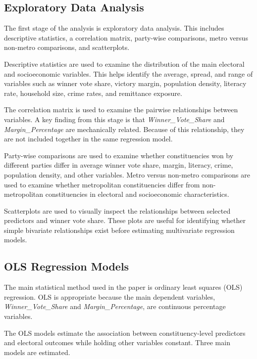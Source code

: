 \documentclass[12pt,a4paper]{article}
\begin{document}
\subsection{Exploratory Data Analysis}

The first stage of the analysis is exploratory data analysis. This includes descriptive statistics, a correlation matrix, party-wise comparisons, metro versus non-metro comparisons, and scatterplots.

Descriptive statistics are used to examine the distribution of the main electoral and socioeconomic variables. This helps identify the average, spread, and range of variables such as winner vote share, victory margin, population density, literacy rate, household size, crime rates, and remittance exposure.

The correlation matrix is used to examine the pairwise relationships between variables. A key finding from this stage is that \textit{Winner\_Vote\_Share} and \textit{Margin\_Percentage} are mechanically related. Because of this relationship, they are not included together in the same regression model.

Party-wise comparisons are used to examine whether constituencies won by different parties differ in average winner vote share, margin, literacy, crime, population density, and other variables. Metro versus non-metro comparisons are used to examine whether metropolitan constituencies differ from non-metropolitan constituencies in electoral and socioeconomic characteristics.

Scatterplots are used to visually inspect the relationships between selected predictors and winner vote share. These plots are useful for identifying whether simple bivariate relationships exist before estimating multivariate regression models.

\subsection{OLS Regression Models}

The main statistical method used in the paper is ordinary least squares (OLS) regression. OLS is appropriate because the main dependent variables, \textit{Winner\_Vote\_Share} and \textit{Margin\_Percentage}, are continuous percentage variables.

The OLS models estimate the association between constituency-level predictors and electoral outcomes while holding other variables constant. Three main models are estimated.
\end{document}
